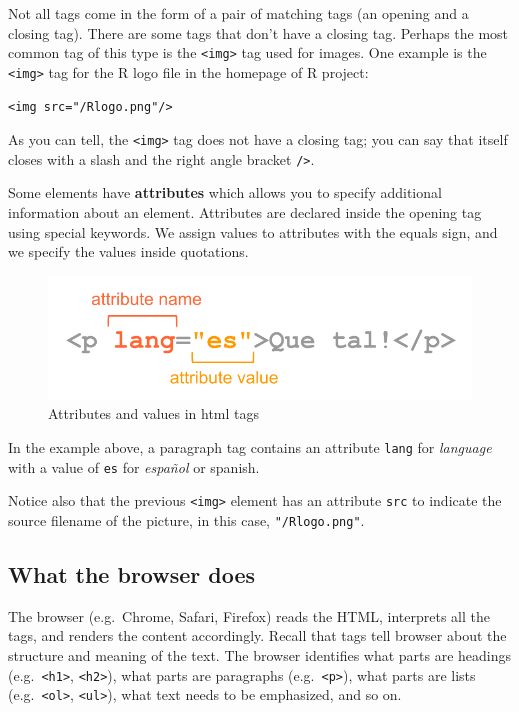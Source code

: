 \documentclass[
]{book}
\begin{document}
Not all tags come in the form of a pair of matching tags (an opening and a
closing tag). There are some tags that don't have a closing tag. Perhaps the
most common tag of this type is the \texttt{\textless{}img\textgreater{}} tag used for images. One example
is the \texttt{\textless{}img\textgreater{}} tag for the R logo file in the homepage of R project:

\begin{verbatim}
<img src="/Rlogo.png"/>
\end{verbatim}

As you can tell, the \texttt{\textless{}img\textgreater{}} tag does not have a closing tag; you can say
that itself closes with a slash and the right angle bracket \texttt{/\textgreater{}}.

Some elements have \textbf{attributes} which allows you to specify additional
information about an element. Attributes are declared inside the opening
tag using special keywords. We assign values to attributes with the equals
sign, and we specify the values inside quotations.

\begin{figure}

{\centering \includegraphics[width=0.7\linewidth]{images/html/html-syntax2} 

}

\caption{Attributes and values in html tags}\label{fig:unnamed-chunk-79}
\end{figure}

In the example above, a paragraph tag contains an attribute \texttt{lang} for
\emph{language} with a value of \texttt{es} for \emph{español} or spanish.

Notice also that the previous \texttt{\textless{}img\textgreater{}} element has an attribute \texttt{src}
to indicate the source filename of the picture, in this case, \texttt{"/Rlogo.png"}.

\hypertarget{what-the-browser-does}{%
\subsection{What the browser does}\label{what-the-browser-does}}

The browser (e.g.~Chrome, Safari, Firefox) reads the HTML, interprets all the
tags, and renders the content accordingly. Recall that tags tell browser about
the structure and meaning of the text. The browser identifies what parts are
headings (e.g.~\texttt{\textless{}h1\textgreater{}}, \texttt{\textless{}h2\textgreater{}}), what parts are paragraphs (e.g.~\texttt{\textless{}p\textgreater{}}),
what parts are lists (e.g.~\texttt{\textless{}ol\textgreater{}}, \texttt{\textless{}ul\textgreater{}}), what text needs to be emphasized,
and so on.
\end{document}
